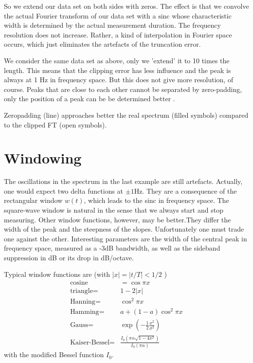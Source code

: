  
So we extend our data set on both sides with zeros.
The effect is that we convolve the actual Fourier transform of our
data set with a $\text{sinc}$ whose characteristic width is determined by the actual
measurement duration. The
frequency resolution does not increase. Rather, a kind of
interpolation in Fourier space occurs, which just eliminates the artefacts of the
truncation error.  


We consider the same data set as above, only we 'extend' it to 10 times the length. This means that the clipping error has less
influence and the peak is always at 1 Hz in frequency space. But this does not give
more resolution, of course. Peaks that are close to each other cannot be
separated by zero-padding, only the position of a peak can be be determined better .  

\begin{marginfigure}
  \caption{Zeropadding (line) approaches better the real spectrum (filled symbols) compared to the clipped FT (open symbols).}
  \label{fig:1_zeropadding}
\end{marginfigure}








\section{Windowing}



The oscillations in the spectrum in the last example are still
artefacts. Actually, one would expect two delta functions at $\pm 1$Hz. They are a consequence of the rectangular window $w(t)$, which
leads to the sinc in frequency space. The square-wave window is natural in the sense that we always start and stop measuring. Other window functions, however, may be better.They differ the width of the peak and the steepness of the slopes. Unfortunately one must trade
one against the other. Interesting parameters are
the width of the central peak in frequency space, measured as a
-3dB bandwidth, as well as the sideband suppression in  dB or its
drop in dB/octave.


Typical window functions are (with $|x| = |t/T| < 1/2$ )
\begin{align}
\text{cosine} &  = \cos \pi x \\
\text{triangle} = & 1 - 2 |x| \\
\text{Hanning} = & \cos^2 \pi x \\
 \text{Hamming} = & a + (1-a)\cos^2 \pi x  \\
 \text{Gauss} = & \exp \left( - \frac{1}{2} \frac{x^2}{\sigma^2} \right) \\
\text{Kaiser-Bessel} =  & \frac{I_0(\pi \alpha \sqrt{1-4 x^2})}{I_0(\pi \alpha)} 
\end{align}
with the modified Bessel function $I_0$.




